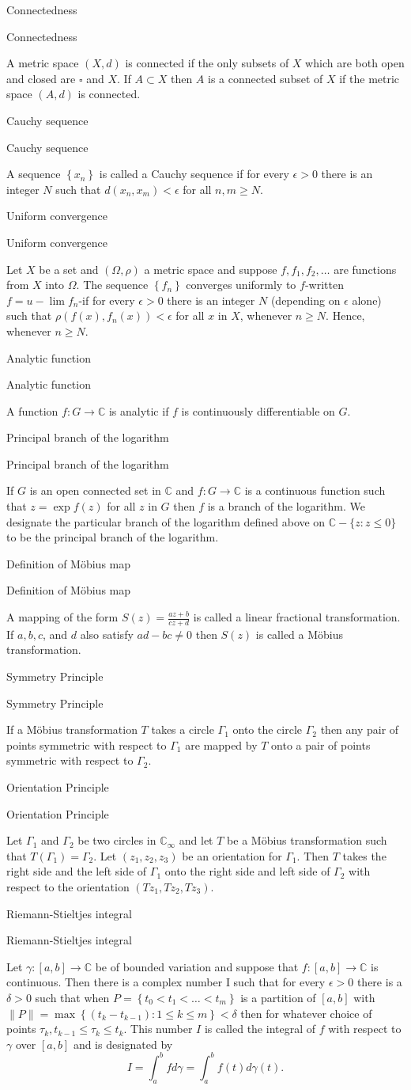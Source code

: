 \documentclass[17pt]{extarticle}
\newcommand{\boxset}[2]{\begin{mdframed}[style=darkQuesion]
  #1
    \end{mdframed}
    \newpage
    \begin{mdframed}[style=darkQuesion]
      #1
        \end{mdframed}
    \begin{mdframed}[style=darkAnswer]
      #2
        \end{mdframed}
        \newpage
  }
\begin{document}
\par
\newpage
\boxset{Connectedness}
{ A metric space $(X, d)$ is connected if the only subsets of $X$ which are both open and closed are $\square$ and $X$. If $A \subset X$ then $A$ is a connected subset of $X$ if the metric space $(A, d)$ is connected.}
\boxset{Cauchy sequence}
{ A sequence $\left\{x_{n}\right\}$ is called a Cauchy sequence if for every $\epsilon>0$ there is an integer $N$ such that $d\left(x_{n}, x_{m}\right)<\epsilon$ for all $n, m \geq N$.}
\boxset{Uniform convergence}
{Let $X$ be a set and $(\Omega, \rho)$ a metric space and suppose $f, f_{1}, f_{2}, \ldots$ are functions from $X$ into $\Omega$. The sequence $\left\{f_{n}\right\}$ converges uniformly to $f$-written $f=u-\lim f_{n}$-if for every $\epsilon>0$ there is an integer $N$ (depending on $\epsilon$ alone) such that $\rho\left(f(x), f_{n}(x)\right)<\epsilon$ for all $x$ in $X$, whenever $n \geq N$. Hence, whenever $n \geq N$.}
\boxset{Analytic function}
{ A function $f: G \rightarrow \mathbb{C}$ is analytic if $f$ is continuously differentiable on $G$.}
\boxset{Principal branch of the logarithm}
{ If $G$ is an open connected set in $\mathbb{C}$ and $f: G \rightarrow \mathbb{C}$ is a continuous function such that $z=\exp f(z)$ for all $z$ in $G$ then $f$ is a branch of the logarithm.
We designate the particular branch of the logarithm defined above on $\mathbb{C}-\{z: z \leq 0\}$ to be the principal branch of the logarithm.}
\boxset{Definition of Möbius map}
{ A mapping of the form $S(z)=\frac{a z+b}{c z+d}$ is called a linear fractional transformation. If $a, b, c$, and $d$ also satisfy $a d-b c \neq 0$ then $S(z)$ is called a Möbius transformation.}
\boxset{Symmetry Principle}
{ If a Möbius transformation $T$ takes a circle $\Gamma_{1}$ onto the circle $\Gamma_{2}$ then any pair of points symmetric with respect to $\Gamma_{1}$ are mapped by $T$ onto a pair of points symmetric with respect to $\Gamma_{2}$.}
\boxset{Orientation Principle}
{ Let $\Gamma_{1}$ and $\Gamma_{2}$ be two circles in $\mathbb{C}_{\infty}$ and let $T$ be a Möbius transformation such that $T\left(\Gamma_{1}\right)=\Gamma_{2}$. Let $\left(z_{1}, z_{2}, z_{3}\right)$ be an orientation for $\Gamma_{1}$. Then $T$ takes the right side and the left side of $\Gamma_{1}$ onto the right side and left side of $\Gamma_{2}$ with respect to the orientation $\left(T z_{1}, T z_{2}, T z_{3}\right)$.}
\boxset{Riemann-Stieltjes integral}
{ Let $\gamma:[a, b] \rightarrow \mathbb{C}$ be of bounded variation and suppose that $f:[a, b] \rightarrow \mathbb{C}$ is continuous. Then there is a complex number I such that for every $\epsilon>0$ there is a $\delta>0$ such that when $P=\left\{t_{0}<t_{1}<\ldots<t_{m}\right\}$ is a partition of $[a, b]$ with $\|P\|=\max \left\{\left(t_{k}-t_{k-1}\right): 1 \leq k \leq m\right\}<\delta$ then
for whatever choice of points $\tau_{k}, t_{k-1} \leq \tau_{k} \leq t_{k}$.
This number $I$ is called the integral of $f$ with respect to $\gamma$ over $[a, b]$ and is designated by
$$
I=\int_{a}^{b} f d \gamma=\int_{a}^{b} f(t) d \gamma(t) .
$$}
\end{document}

